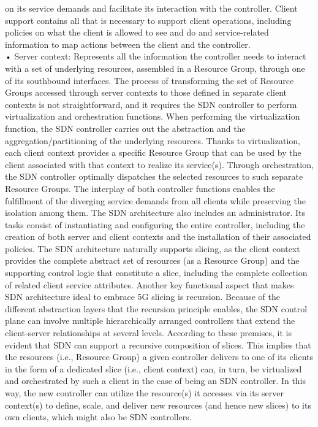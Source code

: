 \documentclass{article}
\begin{document}
on its service demands and facilitate its interaction
with the controller. Client support contains all that
is necessary to support client operations, including
policies on what the client is allowed to see and do and service-related information to map actions
between the client and the controller.\\
• Server context: Represents all the information the controller needs to interact with a set of
underlying resources, assembled in a Resource
Group, through one of its southbound interfaces.
The process of transforming the set of
Resource Groups accessed through server contexts to those defined in separate client contexts
is not straightforward, and it requires the SDN
controller to perform virtualization and orchestration functions.
When performing the virtualization function, the
SDN controller carries out the abstraction and the
aggregation/partitioning of the underlying resources. Thanks to virtualization, each client context provides a specific Resource Group that can be used by the client associated with that context to realize
its service(s). Through orchestration, the SDN controller optimally dispatches the selected resources
to such separate Resource Groups. The interplay
of both controller functions enables the fulfillment
of the diverging service demands from all clients
while preserving the isolation among them.
The SDN architecture also includes an administrator. Its tasks consist of instantiating and configuring the entire controller, including the creation
of both server and client contexts and the installation of their associated policies.
The SDN architecture naturally supports slicing, as the client context provides the complete abstract set of resources
(as a Resource Group) and the supporting control
logic that constitute a slice, including the complete
collection of related client service attributes.
Another key functional aspect that makes SDN
architecture ideal to embrace 5G slicing is recursion. Because of the different abstraction layers
that the recursion principle enables, the SDN
control plane can involve multiple hierarchically
arranged controllers that extend the client-server
relationships at several levels. According to
these premises, it is evident that SDN can support a
recursive composition of slices. This implies that
the resources (i.e., Resource Group) a given controller delivers to one of its clients in the form of a
dedicated slice (i.e., client context) can, in turn, be
virtualized and orchestrated by such a client in the
case of being an SDN controller. In this way, the new
controller can utilize the resource(s) it accesses via
its server context(s) to define, scale, and deliver
new resources (and hence new slices) to its own
clients, which might also be SDN controllers.
\end{document}
